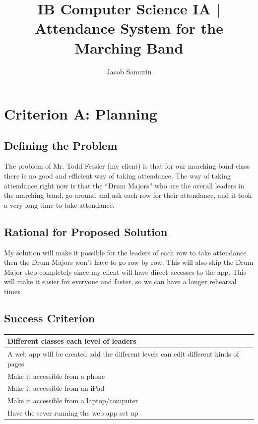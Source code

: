 \documentclass{article}
\title{IB Computer Science IA | Attendance System for the Marching Band}
\author{Jacob Samurin}
\begin{document}
	\maketitle
	\newpage
	\tableofcontents
	\newpage
	\section{Criterion A: Planning}
	\subsection{Defining the Problem}
		The problem of Mr. Todd Fessler (my client) is that for our marching band class there is no good and efficient way of taking attendance. The way of taking attendance right now is that the “Drum Majors” who are the overall leaders in the marching band, go around and ask each row for their attendance, and it took a very long time to take attendance.
		\subsection{Rational for Proposed Solution}
			My solution will make it possible for the leaders of each row to take attendance then the Drum Majors won’t have to go row by row. This will also skip the Drum Major step completely since my client will have direct accesses to the app. This will make it easier for everyone and faster, so we can have a longer rehearsal times.
		\subsection{Success Criterion}
			\begin{center}
				\begin{tabular}{|l|}
					\hline
					Different classes each level of leaders\\
					\hline
					A web app will be created add the different levels can edit different kinds of pages\\
					\hline
					Make it accessible from a phone\\
					\hline
					Make it accessible from an iPad\\
					\hline
					Make it accessible from a laptop/computer\\
					\hline
					Have the sever running the web app set up\\
					\hline
				\end{tabular}
			\end{center}
		\newpage
\end{document}
